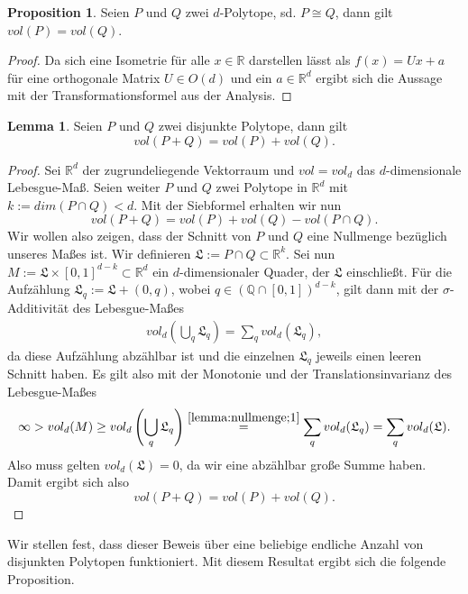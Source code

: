 \documentclass[11pt,titlepage]{article}
\newcommand{\setQ}{\mathbb{Q}}
\newcommand{\setR}{\mathbb{R}}
\theoremstyle{definition}
\newtheorem{proposition}[theorem]{Proposition}
\newtheorem{lemma}[theorem]{Lemma}
\theoremstyle{remark}
\begin{document}
	\begin{proposition} \label{prop:cong,vol}
		Seien $P$ und $Q$ zwei $d$-Polytope, sd. $P\cong Q$, dann gilt $vol(P)=vol(Q)$.
	\end{proposition}
	
	\begin{proof}
		Da sich eine Isometrie für alle $x\in\setR$ darstellen lässt als $f(x)=Ux+a$ für eine orthogonale Matrix $U\in O(d)$ und ein 
		$a\in\setR^d$ ergibt sich die Aussage mit der Transformationsformel 
		aus der Analysis.
	\end{proof}
	
	\begin{lemma}\label{lemma:nullmenge}
		Seien $P$ und $Q$ zwei disjunkte Polytope, dann gilt
		\[ vol(P+Q)=vol(P)+vol(Q).\]
	\end{lemma}

	\begin{proof}
		Sei $\setR^d$ der zugrundeliegende Vektorraum und $vol=vol_d$ das $d$-dimensionale 
		Lebesgue-Maß. Seien weiter $P$ und $Q$ zwei Polytope in $\setR^d$ 
		mit $k:=dim(P\cap Q)<d$. Mit der Siebformel erhalten wir nun
		\[vol(P+Q)=vol(P)+vol(Q)-vol(P\cap Q).\]
		Wir wollen also zeigen, dass der Schnitt von $P$ und $Q$ eine Nullmenge bezüglich unseres Maßes ist. 
		Wir definieren $\mathfrak{L}:=P\cap Q \subset \setR^k$. Sei nun  $M:=\mathfrak{L}\times[0,1]^{d-k}\subset\setR^d$ ein $d$-dimensionaler Quader, der 
		$\mathfrak{L}$ einschließt. Für die Aufzählung $\mathfrak{L}_q:=\mathfrak{L}+(0,q)$, wobei $q\in(\setQ\cap[0,1])^{d-k}$, gilt dann mit der $\sigma$-Additivität des Lebesgue-Maßes
		\begin{align}
			vol_d \left(\bigcup_q\mathfrak{L}_q\right)=\sum_q vol_d(\mathfrak{L}_q), \label{lemma:nullmenge;1}
		\end{align}
		da diese Aufzählung abzählbar ist und die einzelnen $\mathfrak{L}_q$ jeweils einen leeren Schnitt haben. Es gilt also mit der Monotonie und der Translationsinvarianz des Lebesgue-Maßes
		\[\infty>vol_d(M)\geq vol_d\left(\bigcup_q \mathfrak{L}_q\right)\overset{\ref{lemma:nullmenge;1}}{=}\sum_q vol_d(\mathfrak{L}_q)=\sum_q vol_d(\mathfrak{L}).\]
		Also muss gelten $vol_d(\mathfrak{L})=0$, da wir eine abzählbar große Summe haben. 
		Damit ergibt sich also
		\[vol(P+Q)=vol(P)+vol(Q).\]
	\end{proof}

	Wir stellen fest, dass dieser Beweis über eine beliebige endliche Anzahl von disjunkten 
	Polytopen funktioniert. Mit diesem Resultat ergibt sich die folgende Proposition.
	
\end{document}
